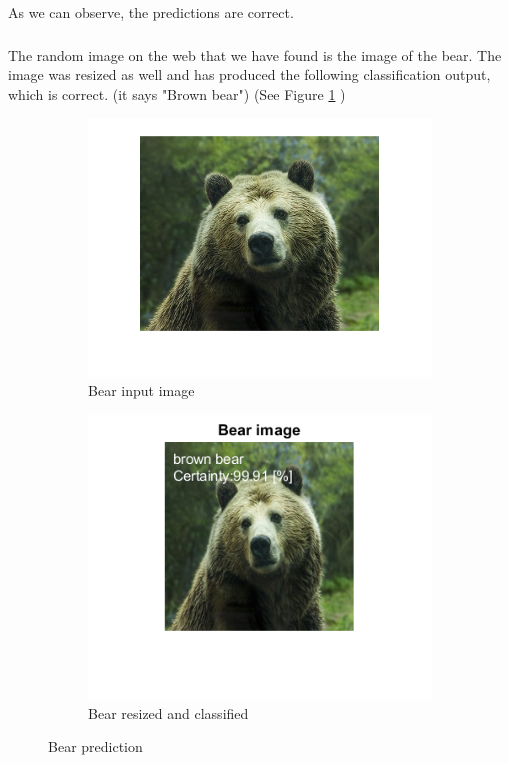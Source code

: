 \documentclass[a4paper]{iacas}
\begin{document}
As we can observe, the predictions are correct.


\subsubsection{}
The random image on the web that we have found is the image of the bear. The image was resized as well and has produced the following classification output, which is correct. (it says "Brown bear") (See Figure  \ref{Bear prediction} )

\vskip 0.1in
\begin{figure}[h!]
  \begin{subfigure}{0.4\linewidth}
	\includegraphics[width=\linewidth]{imgs/bear.png}
	\caption{Bear input image}
  \end{subfigure}
  \begin{subfigure}{0.4\linewidth}
	\includegraphics[width=\linewidth]{imgs/bear_classified.png}
	\caption{Bear resized and classified}
  \end{subfigure}
\caption{Bear prediction}
\label{Bear prediction}
\end{figure}
\vskip 0.1in
\end{document}
